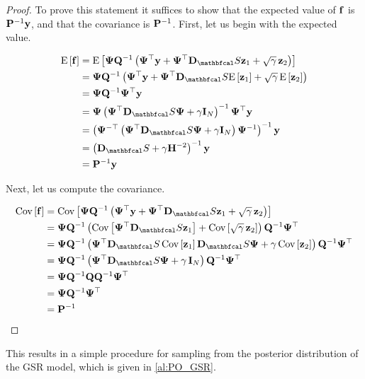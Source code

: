 \begin{proof}
    To prove this statement it suffices to show that the expected value of $\mathbf{f}$ is $\mathbf{P}^{-1}\mathbf{y}$, and that the covariance is $\mathbf{P}^{-1}$. First, let us begin with the expected value. 

    \begin{align*}
        \text{E}\left[\f\right] &= \text{E}\left[\PSI \Q^{-1} \left(\PSI^\top \y + \PSI^\top \D_\St \z_1 + \sqrt{\gamma} \, \z_2\right)\right] \\
        &= \PSI \Q^{-1} \left( \PSI^\top \y + \PSI^\top \D_\St \text{E}\left[\z_1\right]  + \sqrt{\gamma} \, \text{E}\left[\z_2\right] \right) \\
        &= \PSI \Q^{-1} \PSI^\top \y \\
        &= \PSI \left(\PSI^\top \D_\St \PSI + \gamma \I_N\right)^{-1} \PSI^\top \y \\
        &= \left( \PSI^{-\top} \left(\PSI^\top \D_\St \PSI + \gamma \I_N \right) \PSI^{-1}  \right)^{-1}  \y \\
        &= \left(\D_\St + \gamma \HH^{-2}\right)^{-1} \y \\
        &= \PP^{-1} \y 
    \end{align*}

    Next, let us compute the covariance. 

    \begin{align*}
        \text{Cov}\left[\f\right] &= \text{Cov}\left[\PSI \Q^{-1} \left(\PSI^\top \y + \PSI^\top \D_\St \z_1 + \sqrt{\gamma} \, \z_2\right)\right] \\
        &= \PSI \Q^{-1} \left(\text{Cov}\left[ \PSI^\top \D_\St \z_1 \right] + \text{Cov}\left[\sqrt{\gamma} \,  \z_2\right]\right) \Q^{-1} \PSI^\top \\
        &= \PSI \Q^{-1} \left(\PSI^\top \D_\St \, \text{Cov}\left[  \z_1 \right] \D_\St \PSI + \gamma \, \text{Cov}\left[ \z_2\right]\right) \Q^{-1} \PSI^\top  \\
        &= \PSI \Q^{-1} \left(\PSI^\top \D_\St \PSI + \gamma \, \I_N \right) \Q^{-1} \PSI^\top  \\
        &= \PSI \Q^{-1} \Q \Q^{-1} \PSI^\top \\
        &= \PSI \Q^{-1} \PSI^\top \\
        &= \PP^{-1}
    \end{align*}
\end{proof}

This results in a simple procedure for sampling from the posterior distribution of the GSR model, which is given in \cref{al:PO_GSR}. 

